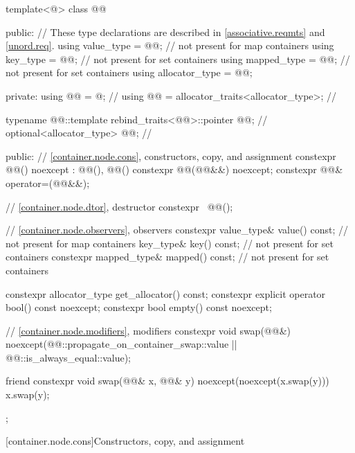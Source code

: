 \begin{codeblock}
template<@\unspecnc@>
class @@ {
public:
  // These type declarations are described in \ref{associative.reqmts} and \ref{unord.req}.
  using value_type     = @\seebelownc{}@;     // not present for map containers
  using key_type       = @\seebelownc{}@;     // not present for set containers
  using mapped_type    = @\seebelownc{}@;     // not present for set containers
  using allocator_type = @\seebelownc{}@;

private:
  using @@ = @\unspecnc@;                  // \expos
  using @@ = allocator_traits<allocator_type>;     // \expos

  typename @@::template
    rebind_traits<@@>::pointer @@;       // \expos
  optional<allocator_type> @@;                          // \expos

public:
  // \ref{container.node.cons}, constructors, copy, and assignment
  constexpr @@() noexcept : @@(), @@() {}
  constexpr @@(@@&&) noexcept;
  constexpr @@& operator=(@@&&);

  // \ref{container.node.dtor}, destructor
  constexpr ~@@();

  // \ref{container.node.observers}, observers
  constexpr value_type& value() const;          // not present for map containers
  key_type& key() const;                        // not present for set containers
  constexpr mapped_type& mapped() const;        // not present for set containers

  constexpr allocator_type get_allocator() const;
  constexpr explicit operator bool() const noexcept;
  constexpr bool empty() const noexcept;

  // \ref{container.node.modifiers}, modifiers
  constexpr void swap(@@&)
    noexcept(@@::propagate_on_container_swap::value ||
             @@::is_always_equal::value);

  friend constexpr void swap(@@& x, @@& y) noexcept(noexcept(x.swap(y))) {
    x.swap(y);
  }
};
\end{codeblock}

[container.node.cons]{Constructors, copy, and assignment}

